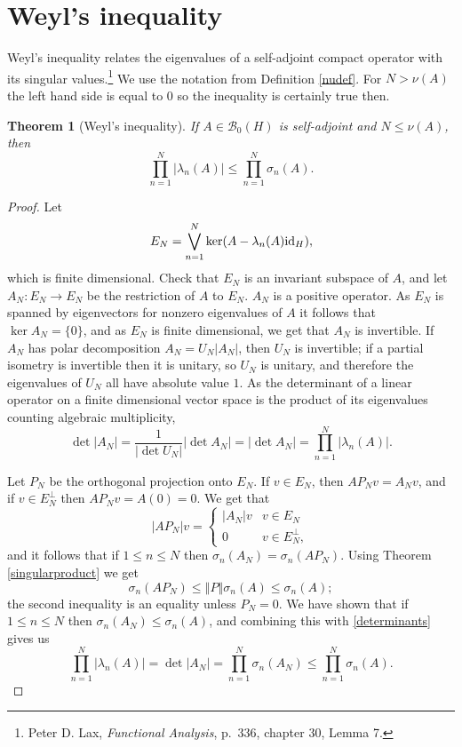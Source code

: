 \documentclass{article}
\newcommand{\id}{\ensuremath\mathrm{id}}
\newcommand{\norm}[1]{\left\Vert #1 \right\Vert}
\newtheorem{theorem}{Theorem}
\theoremstyle{definition}
\begin{document}
\section{Weyl's inequality}
Weyl's inequality relates the eigenvalues of a self-adjoint compact operator with its singular values.\footnote{Peter D. Lax,
{\em Functional Analysis}, p.~336, chapter 30, Lemma 7.} We use the notation from Definition \ref{nudef}. For $N>\nu(A)$ the left hand side is equal to $0$ so the inequality
is certainly true then.


\begin{theorem}[Weyl's inequality]
If $A \in \mathscr{B}_0(H)$ is self-adjoint and $N \leq \nu(A)$, then
\[
\prod_{n=1}^N |\lambda_n(A)| \leq \prod_{n=1}^N \sigma_n(A).
\]
\label{weyl}
\end{theorem}
\begin{proof}
Let
\[
E_N = \bigvee_{n=1}^N \ker(A-\lambda_n(A) \id_H),
\]
which is finite dimensional.
Check that $E_N$ is an invariant subspace of $A$, and  let
$A_N:E_N \to E_N$ be the restriction of $A$ to $E_N$. $A_N$ is a positive operator.
As $E_N$ is spanned by eigenvectors for nonzero eigenvalues of $A$ it follows that $\ker A_N = \{0\}$,
and as $E_N$ is finite dimensional, we get that $A_N$ is invertible. 
If $A_N$ has polar decomposition $A_N=U_N|A_N|$, then $U_N$ is invertible; if a partial isometry is invertible then it is
unitary, so $U_N$ is unitary, and therefore the eigenvalues of $U_N$ all have absolute value $1$. 
As the determinant of a linear operator on a finite dimensional vector space is the product of its eigenvalues counting algebraic
multiplicity,
\begin{equation}
 \det |A_N|=\frac{1}{|\det U_N|} |\det A_N| = |\det A_N| = \prod_{n=1}^N |\lambda_n(A)|.
 \label{determinants}
  \end{equation}

Let $P_N$ be the orthogonal projection onto $E_N$.
 If $v \in E_N$, then $AP_N v = A_N v$, and if $v \in E_N^\perp$
then $AP_N v = A(0)=0$. We get that
\[
|AP_N|v = \begin{cases}
|A_N|v&v \in E_N\\
0&v \in E_N^\perp,
\end{cases}
\]
and it follows that if $1 \leq n \leq N$ then $\sigma_n(A_N) = \sigma_n(AP_N)$. Using Theorem \ref{singularproduct} we get
\[
\sigma_n(AP_N) \leq \norm{P} \sigma_n(A) \leq \sigma_n(A);
\]
the second inequality is an equality unless $P_N=0$. We have shown that if $1 \leq n \leq N$ then
$\sigma_n(A_N) \leq \sigma_n(A)$, and  combining this with \eqref{determinants} gives us
\[
\prod_{n=1}^N |\lambda_n(A)| = \det |A_N| = \prod_{n=1}^N \sigma_n(A_N) \leq \prod_{n=1}^N \sigma_n(A).
\]
\end{proof}
\end{document}
